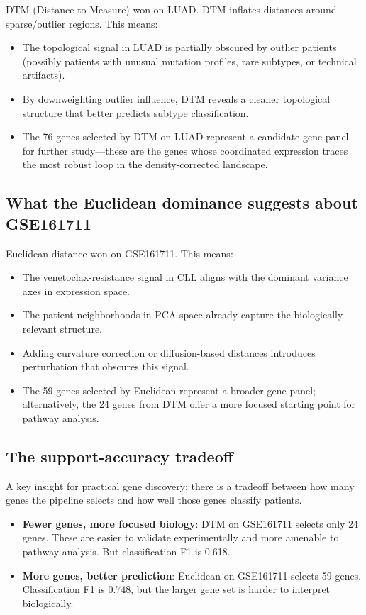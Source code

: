 \documentclass[11pt]{article}
\begin{document}
DTM (Distance-to-Measure) won on LUAD. DTM inflates distances around sparse/outlier regions. This means:
\begin{itemize}
    \item The topological signal in LUAD is partially obscured by outlier patients (possibly patients with unusual mutation profiles, rare subtypes, or technical artifacts).
    \item By downweighting outlier influence, DTM reveals a cleaner topological structure that better predicts subtype classification.
    \item The 76 genes selected by DTM on LUAD represent a candidate gene panel for further study---these are the genes whose coordinated expression traces the most robust loop in the density-corrected landscape.
\end{itemize}

\subsection{What the Euclidean dominance suggests about GSE161711}

Euclidean distance won on GSE161711. This means:
\begin{itemize}
    \item The venetoclax-resistance signal in CLL aligns with the dominant variance axes in expression space.
    \item The patient neighborhoods in PCA space already capture the biologically relevant structure.
    \item Adding curvature correction or diffusion-based distances introduces perturbation that obscures this signal.
    \item The 59 genes selected by Euclidean represent a broader gene panel; alternatively, the 24 genes from DTM offer a more focused starting point for pathway analysis.
\end{itemize}

\subsection{The support-accuracy tradeoff}

A key insight for practical gene discovery: there is a tradeoff between how many genes the pipeline selects and how well those genes classify patients.

\begin{itemize}
    \item \textbf{Fewer genes, more focused biology}: DTM on GSE161711 selects only 24 genes. These are easier to validate experimentally and more amenable to pathway analysis. But classification F1 is 0.618.
    \item \textbf{More genes, better prediction}: Euclidean on GSE161711 selects 59 genes. Classification F1 is 0.748, but the larger gene set is harder to interpret biologically.
\end{itemize}
\end{document}
